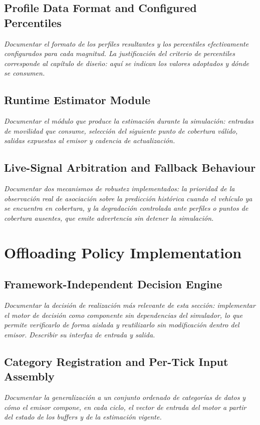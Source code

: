 \subsection{Profile Data Format and Configured Percentiles}
\emph{Documentar el formato de los perfiles resultantes y los percentiles
efectivamente configurados para cada magnitud. La justificación del criterio de
percentiles corresponde al capítulo de diseño: aquí se indican los valores
adoptados y dónde se consumen.}

\subsection{Runtime Estimator Module}
\emph{Documentar el módulo que produce la estimación durante la simulación:
entradas de movilidad que consume, selección del siguiente punto de cobertura
válido, salidas expuestas al emisor y cadencia de actualización.}

\subsection{Live-Signal Arbitration and Fallback Behaviour}
\emph{Documentar dos mecanismos de robustez implementados: la prioridad de la
observación real de asociación sobre la predicción histórica cuando el vehículo
ya se encuentra en cobertura, y la degradación controlada ante perfiles o puntos
de cobertura ausentes, que emite advertencia sin detener la simulación.}

\section{Offloading Policy Implementation}

\subsection{Framework-Independent Decision Engine}
\emph{Documentar la decisión de realización más relevante de esta sección:
implementar el motor de decisión como componente sin dependencias del simulador,
lo que permite verificarlo de forma aislada y reutilizarlo sin modificación
dentro del emisor. Describir su interfaz de entrada y salida.}

\subsection{Category Registration and Per-Tick Input Assembly}
\emph{Documentar la generalización a un conjunto ordenado de categorías de datos
y cómo el emisor compone, en cada ciclo, el vector de entrada del motor a partir
del estado de los buffers y de la estimación vigente.}


